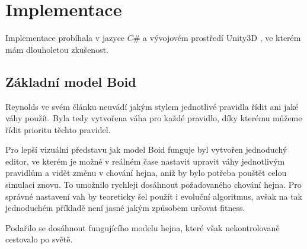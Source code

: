 \section{Implementace}
Implementace probíhala v jazyce $C\#$ a vývojovém prostředí Unity3D \cite{Unity}, ve kterém mám dlouholetou zkušenost. 
\subsection{Základní model Boid}
Reynolds ve svém článku neuvádí jakým stylem jednotlivé pravidla řídit ani jaké váhy použít. Byla tedy vytvořena váha pro každé pravidlo, díky kterému můžeme řídit prioritu těchto pravidel. 
\par
Pro lepší vizuální představu jak model Boid funguje byl vytvořen jednoduchý editor, ve kterém je možné v reálném čase nastavit upravit váhy jednotlivým pravidlům a vidět změnu v chování hejna, aniž by bylo potřeba pouštět celou simulaci znovu. To umožnilo rychleji dosáhnout požadovaného chování hejna. Pro správné nastavení vah by teoreticky šel použít i evoluční algoritmus, avšak na tak jednoduchém příkladě není jasné jakým způsobem určovat fitness. 
\par
Podařilo se dosáhnout fungujícího modelu hejna, které však nekontrolovaně cestovalo po světě. 

